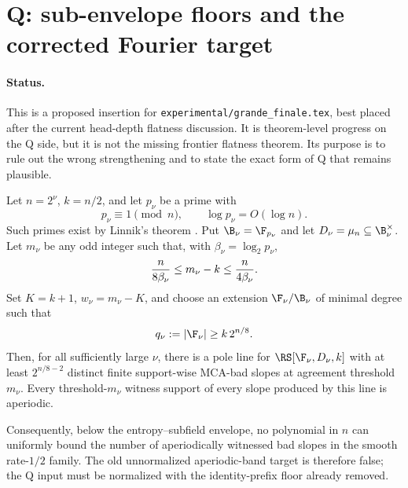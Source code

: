 \section{Q: sub-envelope floors and the corrected Fourier target}
\label{sec:q-next}

\paragraph{Status.}
This is a proposed insertion for \texttt{experimental/grande\_finale.tex},
best placed after the current head-depth flatness discussion.  It is
theorem-level progress on the Q side, but it is not the missing frontier
flatness theorem.  Its purpose is to rule out the wrong strengthening and to
state the exact form of Q that remains plausible.

\begin{theorem}
\label{thm:q-sub-envelope-aperiodic}
Let \(n=2^\nu\), \(k=n/2\), and let \(p_\nu\) be a prime with
\[
        p_\nu\equiv 1\pmod n,\qquad \log p_\nu=O(\log n).
\]
Such primes exist by Linnik's theorem \cite{Linnik44}.  Put
\(\B_\nu=\F_{p_\nu}\) and
let \(D_\nu=\mu_n\subseteq \B_\nu^\times\).  Let \(m_\nu\) be any odd integer
such that, with \(\beta_\nu=\log_2 p_\nu\),
\[
        {n\over 8\beta_\nu}
        \le
        m_\nu-k
        \le
        {n\over 4\beta_\nu}.
\]
Set \(K=k+1\), \(w_\nu=m_\nu-K\), and choose an extension
\(\F_\nu/\B_\nu\) of minimal degree such that
\[
        q_\nu:=|\F_\nu|\ge k\,2^{n/8}.
\]
Then, for all sufficiently large \(\nu\), there is a pole line for
\(\RS[\F_\nu,D_\nu,k]\) with at least \(2^{n/8-2}\) distinct finite
support-wise MCA-bad slopes at agreement threshold \(m_\nu\).  Every
threshold-\(m_\nu\) witness support of every slope produced by this line is
aperiodic.

Consequently, below the entropy--subfield envelope, no polynomial in \(n\)
can uniformly bound the number of aperiodically witnessed bad slopes in the
smooth rate-\(1/2\) family.  The old unnormalized aperiodic-band target is
therefore false; the Q input must be normalized with the identity-prefix
floor already removed.
\end{theorem}

